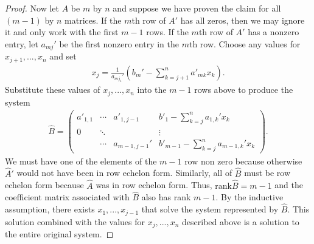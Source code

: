 \documentclass[12pt,reqno]{amsart}
\newcommand{\rank}{\mathrm{rank}}
\theoremstyle{definition}
\begin{document}
\begin{proof}
  Now let $A$ be $m$ by $n$ and suppose we have proven the claim for
  all $(m-1)$ by $n$ matrices. If the $m$th row of $A'$ has all zeros,
  then we may ignore it and only work with the first $m-1$ rows. If
  the $m$th row of $A'$ has a nonzero entry, let $a_{mj}'$ be the
  first nonzero entry in the $m$th row. Choose any values for
  $x_{j+1},...,x_n$ and set
  \begin{align*}
    x_{j} = \frac{1}{a_{mj_1}'} \left(b_m' - \sum_{k = j+1}^n a'_{mk}
      x_{k} \right).
  \end{align*}
  Substitute these values of $x_j, ..., x_n$ into the $m-1$ rows above
  to produce the system
  \begin{align*}
    \hat{B} = \begin{pmatrix}
      a'_{1,1} & \cdots  & a'_{1,j-1} & b'_1 - \sum_{k=j}^n a_{1,k}' x_k  \\
      0 & \ddots &                & \vdots \\ 
          & \cdots  & a_{m-1,j-1}' & b'_{m-1} - \sum_{k=j}^n a_{m-1,k}'x_k 
    \end{pmatrix}.
  \end{align*}
  We must have one of the elements of the $m-1$ row non zero because
  otherwise $\hat{A}'$ would not have been in row echelon
  form. Similarly, all of $\hat{B}$ must be row echelon form because
  $\hat{A}$ was in row echelon form. Thus, $\rank \hat{B} = m-1$ and the
  coefficient matrix associated with $\hat{B}$ also has rank $m-1$. By
  the inductive assumption, there exists $x_1, ... , x_{j-1}$ that
  solve the system represented by $\hat{B}$. This solution combined
  with the values for $x_j , ..., x_n$ described above is a solution
  to the entire original system.
\end{proof}
\end{document}
